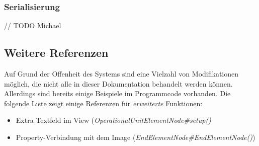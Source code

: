 \subsubsection{Serialisierung}
// TODO Michael

\pagebreak
\subsection{Weitere Referenzen}
\label{code_extra_references}
Auf Grund der Offenheit des Systems sind eine Vielzahl von Modifikationen möglich, die nicht alle in dieser
Dokumentation behandelt werden können. Allerdings sind bereits einige Beispiele im Programmcode vorhanden.
Die folgende Liste zeigt einige Referenzen für \textit{erweiterte} Funktionen:

\begin{itemize}
	\item Extra Textfeld im View (\textit{OperationalUnitElementNode\#setup()}
	\item Property-Verbindung mit dem Image (\textit{EndElementNode\#EndElementNode()})
\end{itemize}